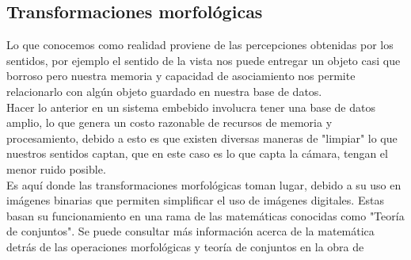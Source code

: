 \subsection{Transformaciones morfológicas}
Lo que conocemos como realidad proviene de las percepciones obtenidas por los sentidos, por ejemplo el sentido de la vista
nos puede entregar un objeto casi que borroso pero nuestra memoria y capacidad de asociamiento nos permite relacionarlo con
algún objeto guardado en nuestra base de datos.\\
Hacer lo anterior en un sistema embebido involucra tener una base de datos amplio, lo que genera un costo razonable de recursos
de memoria y procesamiento, debido a esto es que existen diversas maneras de "limpiar" lo que nuestros sentidos captan, que en 
este caso es lo que capta la cámara, tengan el menor ruido posible.\\
Es aquí donde las transformaciones morfológicas toman lugar, debido a su uso en imágenes binarias que permiten simplificar
el uso de imágenes digitales. Estas basan su funcionamiento en una rama de las matemáticas conocidas como "Teoría de conjuntos".
Se puede consultar más información acerca de la matemática detrás de las operaciones morfológicas y teoría de conjuntos en la
obra de %

